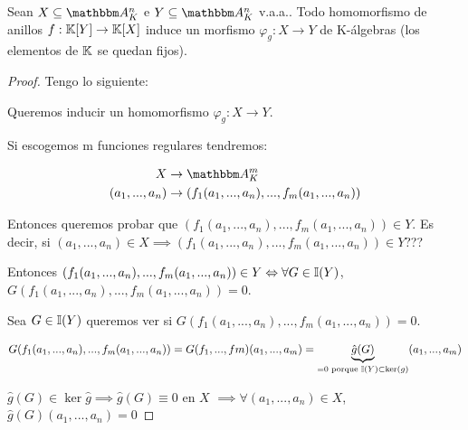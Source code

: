 	\begin{prop}
		Sean $X \subseteq \Akn$ e $Y \subseteq \Akn$ v.a.a.. Todo homomorfismo de anillos $f: \mathbb{K}[Y] \rightarrow \mathbb{K}[X]$ induce un morfismo $\varphi_g: X \rightarrow Y$ de K-álgebras (los elementos de $\mathbb{K}$ se quedan fijos).
	\end{prop}

	\begin{proof}
		Tengo lo siguiente:


		Queremos inducir un homomorfismo $\varphi_g: X \rightarrow Y$.

		Si escogemos m funciones regulares tendremos:


		\begin{align*}
			X & \rightarrow \A_K^m \\
			(a_1,...,a_n) & \rightarrow (f_1(a_1,...,a_n),...,f_m(a_1,...,a_n))
		\end{align*}

		Entonces queremos probar que $(f_1(a_1,...,a_n),...,f_m(a_1,...,a_n)) \in Y$. Es decir, si $(a_1,...,a_n) \in X \implies (f_1(a_1,...,a_n),...,f_m(a_1,...,a_n)) \in Y$???

		Entonces $(f_1(a_1,...,a_n),...,f_m(a_1,...,a_n)) \in Y \Leftrightarrow \forall G \in \mathbb{I}(Y)$, $G(f_1(a_1,...,a_n),...,f_m(a_1,...,a_n))=0$.

		Sea $G\in \mathbb{I}(Y)$ queremos ver si $G(f_1(a_1,...,a_n),...,f_m(a_1,...,a_n))=0$.

		$$G(f_1(a_1,...,a_n),...,f_m(a_1,...,a_n))=G(f_1,...,fm)(a_1,...,a_m)= \underbrace{\hat{g}(G)}_{=0 \text{ porque } \mathbb{I}(Y) \subset \ker(g)}(a_1,...,a_m)$$

		$\hat{g}(G) \in \ker \hat{g} \implies \hat{g}(G) \equiv 0$ en $X$ $\implies \forall(a_1,...,a_n) \in X$, $\hat{g}(G)(a_1,...,a_n)=0$
	\end{proof}


